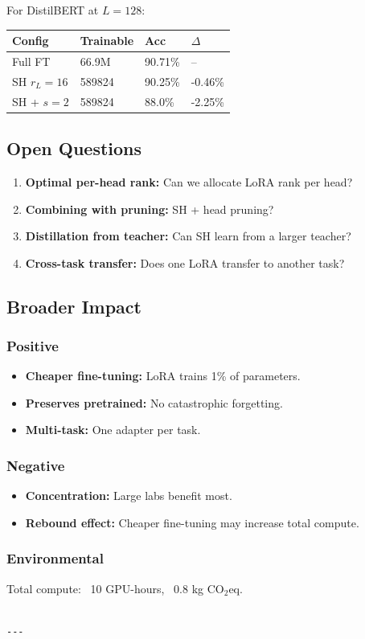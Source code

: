 For DistilBERT at $L = 128$:

\begin{table}[H]
\centering
\small
\begin{tabular}{llll}
\toprule
\textbf{Config} & \textbf{Trainable} & \textbf{Acc} & \textbf{$\Delta$} \\
\midrule
Full FT & 66.9M & 90.71\% & -- \\
SH $r_L=16$ & 589824 & 90.25\% & -0.46\% \\
SH + $s=2$ & 589824 & 88.0\% & -2.25\% \\
\bottomrule
\end{tabular}
\end{table}

\subsection{Open Questions}

\begin{enumerate}
\item \textbf{Optimal per-head rank:} Can we allocate LoRA rank per head?
\item \textbf{Combining with pruning:} SH + head pruning?
\item \textbf{Distillation from teacher:} Can SH learn from a larger teacher?
\item \textbf{Cross-task transfer:} Does one LoRA transfer to another task?

\end{enumerate}
\subsection{Broader Impact}

\subsubsection{Positive}
\begin{itemize}
\item \textbf{Cheaper fine-tuning:} LoRA trains 1\% of parameters.
\item \textbf{Preserves pretrained:} No catastrophic forgetting.
\item \textbf{Multi-task:} One adapter per task.

\end{itemize}
\subsubsection{Negative}
\begin{itemize}
\item \textbf{Concentration:} Large labs benefit most.
\item \textbf{Rebound effect:} Cheaper fine-tuning may increase total compute.

\end{itemize}
\subsubsection{Environmental}
Total compute: ~10 GPU-hours, ~0.8 kg CO$_2$eq.
\begin{lstlisting}

---
\end{lstlisting}